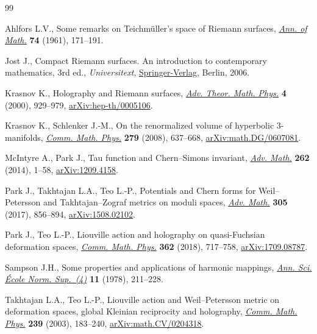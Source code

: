 \begin{thebibliography}{99}
\footnotesize\itemsep=0pt

Ahlfors L.V., Some remarks on {T}eichm\"uller's space of {R}iemann surfaces,
 \href{https://doi.org/10.2307/1970309}{\textit{Ann. of Math.}} \textbf{74} (1961), 171--191.

Jost J., Compact {R}iemann surfaces. An introduction to contemporary
 mathematics, 3rd ed., \textit{Universitext}, \href{https://doi.org/10.1007/978-3-540-33067-7}{Springer-Verlag}, Berlin, 2006.

Krasnov K., Holography and {R}iemann surfaces, \href{https://doi.org/10.4310/ATMP.2000.v4.n4.a5}{\textit{Adv. Theor. Math. Phys.}}
 \textbf{4} (2000), 929--979, \href{https://arxiv.org/abs/hep-th/0005106}{arXiv:hep-th/0005106}.

Krasnov K., Schlenker J.-M., On the renormalized volume of hyperbolic
 3-manifolds, \href{https://doi.org/10.1007/s00220-008-0423-7}{\textit{Comm. Math. Phys.}} \textbf{279} (2008), 637--668,
 \href{https://arxiv.org/abs/math.DG/0607081}{arXiv:math.DG/0607081}.

McIntyre A., Park J., Tau function and {C}hern--{S}imons invariant,
 \href{https://doi.org/10.1016/j.aim.2014.05.005}{\textit{Adv. Math.}} \textbf{262} (2014), 1--58, \href{https://arxiv.org/abs/1209.4158}{arXiv:1209.4158}.

Park J., Takhtajan L.A., Teo L.-P., Potentials and {C}hern forms for
 {W}eil--{P}etersson and {T}akhtajan--{Z}ograf metrics on moduli spaces,
 \href{https://doi.org/10.1016/j.aim.2016.10.002}{\textit{Adv. Math.}} \textbf{305} (2017), 856--894, \href{https://arxiv.org/abs/1508.02102}{arXiv:1508.02102}.

Park J., Teo L.-P., Liouville action and holography on quasi-{F}uchsian
 deformation spaces, \href{https://doi.org/10.1007/s00220-018-3164-2}{\textit{Comm. Math. Phys.}} \textbf{362} (2018), 717--758,
 \href{https://arxiv.org/abs/1709.08787}{arXiv:1709.08787}.

Sampson J.H., Some properties and applications of harmonic mappings,
 \href{https://doi.org/10.24033/asens.1344}{\textit{Ann. Sci. \'Ecole Norm. Sup.~(4)}} \textbf{11} (1978), 211--228.

Takhtajan L.A., Teo L.-P., Liouville action and {W}eil--{P}etersson metric on
 deformation spaces, global {K}leinian reciprocity and holography,
 \href{https://doi.org/10.1007/s00220-003-0878-5}{\textit{Comm. Math. Phys.}} \textbf{239} (2003), 183--240,
 \href{https://arxiv.org/abs/math.CV/0204318}{arXiv:math.CV/0204318}.


\end{thebibliography}
